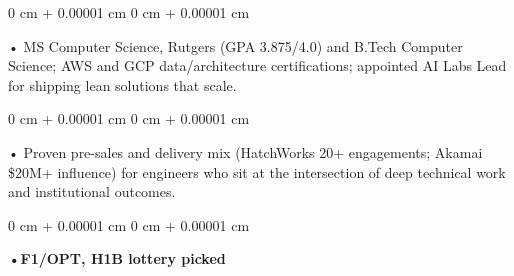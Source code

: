 \documentclass[10pt, letterpaper]{article}
\newenvironment{onecolentry}{
    \begin{adjustwidth}{
        0 cm + 0.00001 cm
    }{
        0 cm + 0.00001 cm
    }
}{
    \end{adjustwidth}
} %
\begin{document}
        \begin{onecolentry}
            • MS Computer Science, Rutgers (GPA 3.875/4.0) and B.Tech Computer Science; AWS and GCP data/architecture certifications; appointed AI Labs Lead for shipping lean solutions that scale.
        \end{onecolentry}
        \begin{onecolentry}
            • Proven pre-sales and delivery mix (HatchWorks 20+ engagements; Akamai \$20M+ influence) for engineers who sit at the intersection of deep technical work and institutional outcomes.
        \end{onecolentry}
        \begin{onecolentry}
                \textbf{•F1/OPT, H1B lottery picked}
        \end{onecolentry}

    \vspace{2 pt }
\end{document}
